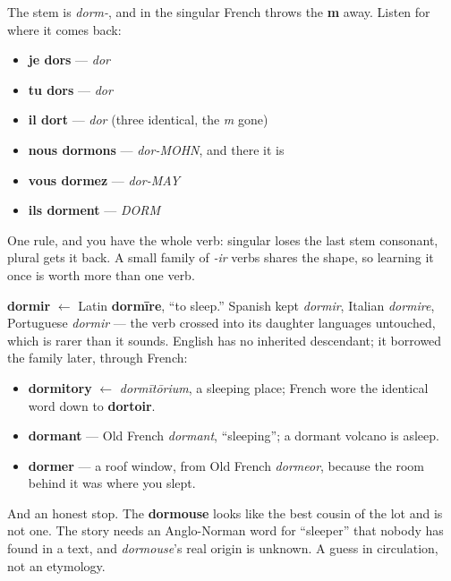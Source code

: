 \begin{grammarlens}[title={Grammar Lens: the m that goes missing}]
The stem is \emph{dorm-}, and in the singular French throws the \textbf{m} away. Listen for where it comes back:

\begin{itemize}
\raggedright
  \item \textbf{je dors} — \emph{dor}
  \item \textbf{tu dors} — \emph{dor}
  \item \textbf{il dort} — \emph{dor} (three identical, the \emph{m} gone)
  \item \textbf{nous dormons} — \emph{dor-MOHN}, and there it is
  \item \textbf{vous dormez} — \emph{dor-MAY}
  \item \textbf{ils dorment} — \emph{DORM}
\end{itemize}

One rule, and you have the whole verb: singular loses the last stem consonant, plural gets it back. A small family of \emph{-ir} verbs shares the shape, so learning it once is worth more than one verb.
\end{grammarlens}

\begin{cousinweb}
\textbf{dormir} $\leftarrow$ Latin \textbf{dormīre}, \textquotedblleft{}to sleep.\textquotedblright{} Spanish kept \emph{dormir}, Italian \emph{dormire}, Portuguese \emph{dormir} — the verb crossed into its daughter languages untouched, which is rarer than it sounds. English has no inherited descendant; it borrowed the family later, through French:

\begin{itemize}
\raggedright
  \item \textbf{dormitory} $\leftarrow$ \emph{dormītōrium}, a sleeping place; French wore the identical word down to \textbf{dortoir}.
  \item \textbf{dormant} — Old French \emph{dormant}, \textquotedblleft{}sleeping\textquotedblright{}; a dormant volcano is asleep.
  \item \textbf{dormer} — a roof window, from Old French \emph{dormeor}, because the room behind it was where you slept.
\end{itemize}

And an honest stop. The \textbf{dormouse} looks like the best cousin of the lot and is not one. The story needs an Anglo-Norman word for \textquotedblleft{}sleeper\textquotedblright{} that nobody has found in a text, and \emph{dormouse}'s real origin is unknown. A guess in circulation, not an etymology.
\end{cousinweb}


